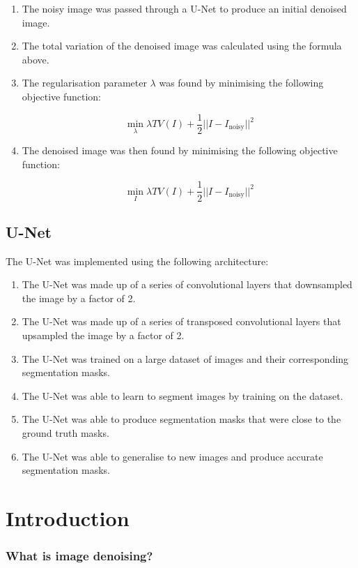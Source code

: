 \documentclass[12pt]{article}
\begin{document}
\begin{enumerate}
    \item The noisy image was passed through a U-Net to produce an initial denoised image.
    \item The total variation of the denoised image was calculated using the formula above.
    \item The regularisation parameter $\lambda$ was found by minimising the following objective function:
    
    \[
    \min_{\lambda} \lambda TV(I) + \frac{1}{2} ||I - I_{\text{noisy}}||^2
    \]
    
    \item The denoised image was then found by minimising the following objective function:
    
    \[
    \min_{I} \lambda TV(I) + \frac{1}{2} ||I - I_{\text{noisy}}||^2
    \]
\end{enumerate}

\subsection{U-Net}

The U-Net was implemented using the following architecture:

\begin{enumerate}
    \item The U-Net was made up of a series of convolutional layers that downsampled the image by a factor of 2.
    \item The U-Net was made up of a series of transposed convolutional layers that upsampled the image by a factor of 2.
    \item The U-Net was trained on a large dataset of images and their corresponding segmentation masks.
    \item The U-Net was able to learn to segment images by training on the dataset.
    \item The U-Net was able to produce segmentation masks that were close to the ground truth masks.
    \item The U-Net was able to generalise to new images and produce accurate segmentation masks.
\end{enumerate}

\section{Introduction}


\subsubsection{What is image denoising?}
\end{document}
